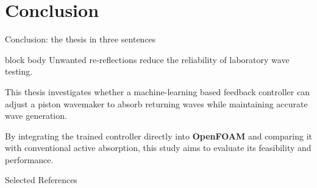 \documentclass[aspectratio=43,11pt]{beamer}
\begin{document}
\section{Conclusion}
\begin{frame}[t]{Conclusion: the thesis in three sentences}
\vspace{0.4cm}
\begin{beamercolorbox}[rounded=true,sep=2.5ex,wd=\linewidth]{block body}
  \large
  Unwanted re-reflections reduce the reliability of laboratory wave testing.

  \vspace{3mm}
  This thesis investigates whether a \textcolor{metured}{machine-learning based
  feedback controller} can adjust a piston wavemaker to absorb returning waves while maintaining accurate wave generation.

  \vspace{3mm} 
  By integrating the trained controller directly into
  \textbf{OpenFOAM} and comparing it with conventional
  active absorption, this study aims to evaluate its
  feasibility and performance.
\end{beamercolorbox}
\vfill
\end{frame}

\begin{frame}[t]{Selected References}
\nocite{schaffer2003,altomare2017,xie2023,xie2022easily,higuera2013realistic,schaffer2000review,gillan2022}
\printbibliography[heading=none]
\end{frame}

\makethanks
\end{document}
